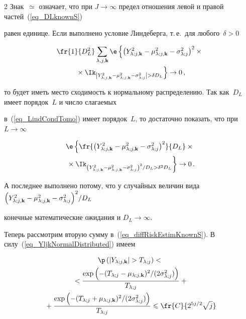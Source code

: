 \begin{multicols}{2}
Знак~$\simeq$ означает, что при $J\rightarrow\infty$ предел отношения левой и правой частей~(\ref{eq_DLknownS}) 


равен единице. Если выполнено условие Линдеберга, т.\,е.\ для любого~$\delta>0$


\begin{multline}


\fr{1}{D_L^2}\sumljk\e\left\{ \left( \Yljk^2 - \muljk^2 - \slj \right)^2\times{}\right.\\


\left.{}\times \Ik_{\left|\Yljk^2 - \muljk^2 - \slj\right|>\delta D_L} \right\} \rightarrow 0\,,


\label{eq_LindCondTomo}


\end{multline}


то будет иметь место сходимость к нормальному распределению. Так как~$D_L$ имеет порядок~$L$ и чис\-ло слагаемых 


в~(\ref{eq_LindCondTomo}) имеет порядок~$L$, то достаточно показать, что при $L\rightarrow\infty$


\begin{multline*}


\e\left\{ \fr{\left( \Yljk^2 - \muljk^2 - \slj \right)^2}{D_L} \times{}\right.\\


\left.{}\times\Ik_{\left(\Yljk^2 - \muljk^2 - \slj\right)^2/D_L>\delta^2 D_L} \right\} \rightarrow 0\,.


\end{multline*}


А последнее выполнено потому, что у случайных величин вида $\left( Y_{\lambda;j,\mathbf{k}}^2 - \mu_{\lambda;j,\mathbf{k}}^2 - \sigma_{\lambda;j}^2 \right)^2\!/D_L$ 


конечные математические ожидания и $D_L\rightarrow\infty$.





Теперь рассмотрим вторую сумму в~(\ref{eq_diffRiskEstimKnownS}). В силу~(\ref{eq_YljkNormalDistributed}) имеем


\begin{multline*}


\p\left( |\Yljk| > \Tlj \right) < {}\\


{}< \frac{\exp\left( -(\Tlj-\muljk)^2/(2\slj) \right)}{\Tlj} +{}\\


{}+ \frac{\exp\left( -(\Tlj+\muljk)^2/(2\slj) \right)}{\Tlj} \leqslant \fr{C}{2^{5j/2} \sqrt{j} }



\end{multline*}
\end{multicols}

